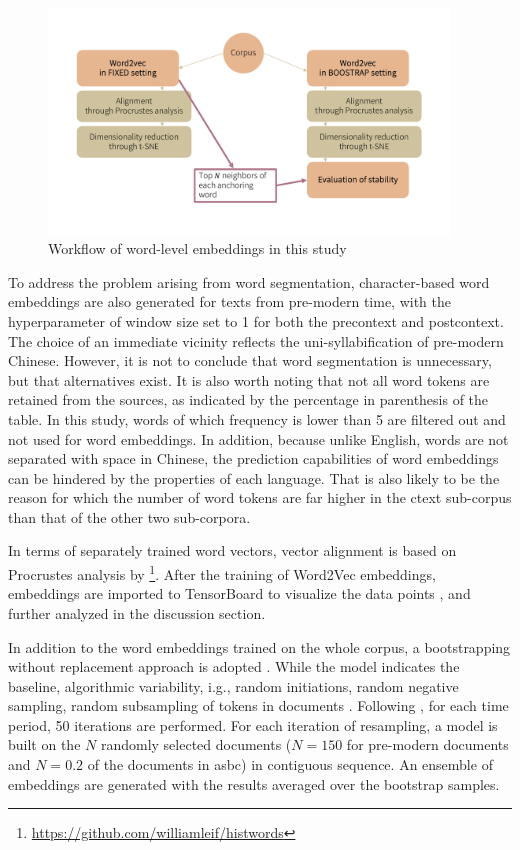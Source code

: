 \begin{figure}[H]
  \centering
  \includegraphics[height=0.4\textheight,width=0.95\textwidth,keepaspectratio]{figures_new/from_slides/workflow_word_level.pdf}
  \caption{Workflow of word-level embeddings in this study}
  \label{fig:workflow_word_level}
\end{figure}

To address the problem arising from word segmentation, character-based word embeddings are also generated for texts from pre-modern time, with the hyperparameter of window size set to 1 for both the precontext and postcontext. The choice of an immediate vicinity reflects the uni-syllabification of pre-modern Chinese. However, it is not to conclude that word segmentation is unnecessary, but that alternatives exist.  It is also worth noting that not all word tokens are retained from the sources, as indicated by the percentage in parenthesis of the table. In this study, words of which frequency is lower than 5 are filtered out and not used for word embeddings. In addition, because unlike English, words are not separated with space in Chinese, the prediction capabilities of word embeddings can be hindered by the properties of each language. That is also likely to be the reason for which the number of word tokens are far higher in the \gls{ctext} sub-corpus than that of the other two sub-corpora.

In terms of separately trained word vectors, vector alignment is based on Procrustes analysis by \textcite{hamilton2016law}\footnote{\url{https://github.com/williamleif/histwords}}. After the training of Word2Vec embeddings, embeddings are imported to TensorBoard to visualize the data points \parencite{smilkov2016projector}, and further analyzed in the discussion section.

In addition to the word embeddings trained on the whole corpus, a bootstrapping without replacement approach is adopted \parencite{antoniak2018evaluating}. While the  model indicates the baseline, algorithmic variability, i.g., random initiations, random negative sampling, random subsampling of tokens in documents \parencite{antoniak2018evaluating}. Following \textcite{antoniak2018evaluating}, for each time period, 50 iterations are performed. For each iteration of resampling, a model is built on the $N$ randomly selected documents ($N=150$ for pre-modern documents and $N=0.2$ of the documents in \gls{asbc}) in contiguous sequence. An ensemble of embeddings are generated with the results averaged over the bootstrap samples.

